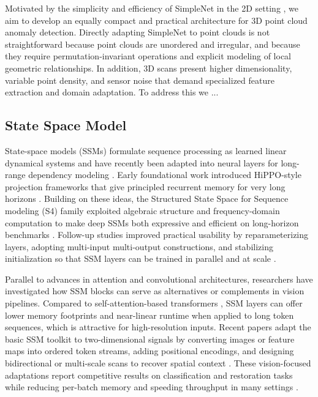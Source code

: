 Motivated by the simplicity and efficiency of SimpleNet in the 2D setting \cite{liu2023simplenet}, we aim to develop an equally compact and practical architecture for 3D point cloud anomaly detection. Directly adapting SimpleNet to point clouds is not straightforward because point clouds are unordered and irregular, and because they require permutation-invariant operations and explicit modeling of local geometric relationships. In addition, 3D scans present higher dimensionality, variable point density, and sensor noise that demand specialized feature extraction and domain adaptation. To address this we ...

\subsection{State Space Model}

State-space models (SSMs) formulate sequence processing as learned linear dynamical systems and have recently been adapted into neural layers for long-range dependency modeling \cite{gu2020hippo,gu2021efficiently,gu2021combining,gu2022parameterization,smith2022simplified}.  Early foundational work introduced HiPPO-style projection frameworks that give principled recurrent memory for very long horizons \cite{gu2020hippo}.  Building on these ideas, the Structured State Space for Sequence modeling (S4) family exploited algebraic structure and frequency-domain computation to make deep SSMs both expressive and efficient on long-horizon benchmarks \cite{gu2021efficiently}.  Follow-up studies improved practical usability by reparameterizing layers, adopting multi-input multi-output constructions, and stabilizing initialization so that SSM layers can be trained in parallel and at scale \cite{gu2021combining,gu2022parameterization,smith2022simplified}.

Parallel to advances in attention and convolutional architectures, researchers have investigated how SSM blocks can serve as alternatives or complements in vision pipelines.  Compared to self-attention-based transformers \cite{vaswani2017attention}, SSM layers can offer lower memory footprints and near-linear runtime when applied to long token sequences, which is attractive for high-resolution inputs.  Recent papers adapt the basic SSM toolkit to two-dimensional signals by converting images or feature maps into ordered token streams, adding positional encodings, and designing bidirectional or multi-scale scans to recover spatial context \cite{zhu2024vision,liu2024vmamba,guo2024mambair}.  These vision-focused adaptations report competitive results on classification and restoration tasks while reducing per-batch memory and speeding throughput in many settings \cite{zhu2024vision,liu2024vmamba,guo2024mambair}.

